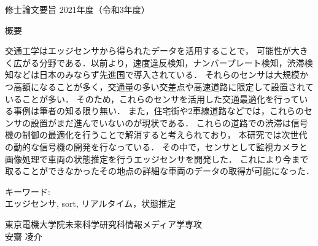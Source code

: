 \newpage
\pagestyle{plain}
\begin{center}
\LARGE{修士論文要旨 \hspace{10mm} 2021年度（令和3年度）}\\

\vspace{10mm}

\end{center}

\begin{center}
概要\\
\end{center}
交通工学はエッジセンサから得られたデータを活用することで，
可能性が大きく広がる分野である．以前より，速度違反検知，ナンバープレート検知，渋滞検知などは日本のみならず先進国で導入されている．
それらのセンサは大規模かつ高額になることが多く，交通量の多い交差点や高速道路に限定して設置されていることが多い．
そのため，これらのセンサを活用した交通最適化を行っている事例は筆者の知る限り無い．
また，住宅街や2車線道路などでは，これらのセンサの設置がまだ進んでいないのが現状である．
これらの道路での渋滞は信号機の制御の最適化を行うことで解消すると考えられており，
本研究では次世代の動的な信号機の開発を行なっている．
その中で，センサとして監視カメラと画像処理で車両の状態推定を行うエッジセンサを開発した．
これにより今まで取ることができなかったその地点の詳細な車両のデータの取得が可能になった．


\begin{flushleft}キーワード:\\
エッジセンサ, sort, リアルタイム，状態推定
\end{flushleft}


\begin{center}
\vspace{10mm}
\begin{flushright}\large 東京電機大学院未来科学研究科情報メディア学専攻\\
\LARGE 安齋 凌介\\
\end{flushright}
\end{center}
